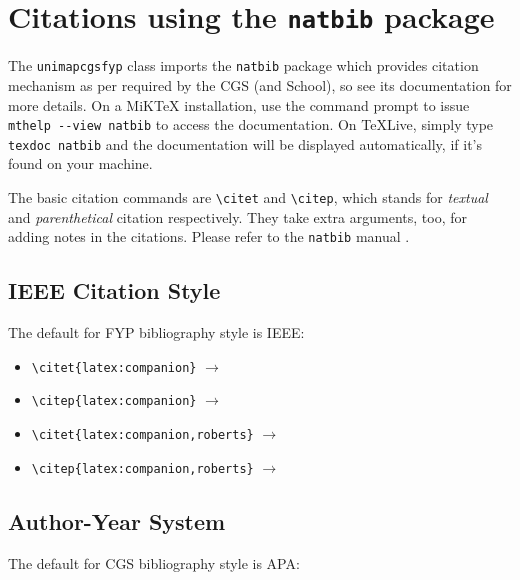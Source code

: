 \section{Citations using the \texttt{natbib} package}
The \verb|unimapcgsfyp| class imports the \verb|natbib| package which provides citation mechanism as per required by the CGS (and School), so see its documentation for more details.  On a MiK\TeX{} installation,
use the command prompt to issue \lstinline|mthelp --view natbib| to access the documentation.
On TeXLive, simply type \verb|texdoc natbib| and the documentation will be displayed automatically, if it's found on your machine.

The basic citation commands are \verb|\citet| and \verb|\citep|, which stands for \emph{textual} and \emph{parenthetical} citation respectively.  They take extra arguments, too, for adding notes in the citations.  Please refer to the \verb|natbib| manual \cite{cgs:thesis:guideline:2017,latex:companion,lim:2007,lim:latextypesetting}. 

\subsection{IEEE Citation Style}
The default for FYP bibliography style is IEEE:
\begin{itemize}[nosep]
	\item \verb|\citet{latex:companion}| $\to$ \citet{latex:companion}
	\item \verb|\citep{latex:companion}| $\to$ \citep{latex:companion}
	\item \verb|\citet{latex:companion,roberts}| $\to$ \citet{latex:companion,roberts}
	\item \verb|\citep{latex:companion,roberts}| $\to$ \citep{latex:companion,roberts}
\end{itemize}

\subsection{Author-Year System}
The default for CGS bibliography style is APA:

